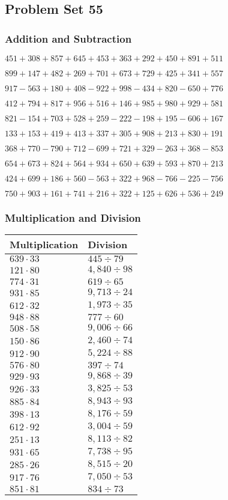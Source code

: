 \hypertarget{problem-set-55-1}{%
\subsection{Problem Set 55}\label{problem-set-55-1}}

\hypertarget{addition-and-subtraction-155}{%
\subsubsection{Addition and
Subtraction}\label{addition-and-subtraction-155}}

\(451 + 308 + 857 + 645 + 453 + 363 + 292 + 450 + 891 + 511\)

\(899 + 147 + 482 + 269 + 701 + 673 + 729 + 425 + 341 + 557\)

\(917 - 563 + 180 + 408 - 922 + 998 - 434 + 820 - 650 + 776\)

\(412 + 794 + 817 + 956 + 516 + 146 + 985 + 980 + 929 + 581\)

\(821 - 154 + 703 + 528 + 259 - 222 - 198 + 195 - 606 + 167\)

\(133 + 153 + 419 + 413 + 337 + 305 + 908 + 213 + 830 + 191\)

\(368 + 770 - 790 + 712 - 699 + 721 + 329 - 263 + 368 - 853\)

\(654 + 673 + 824 + 564 + 934 + 650 + 639 + 593 + 870 + 213\)

\(424 + 699 + 186 + 560 - 563 + 322 + 968 - 766 - 225 - 756\)

\(750 + 903 + 161 + 741 + 216 + 322 + 125 + 626 + 536 + 249\)

\hypertarget{multiplication-and-division-155}{%
\subsubsection{Multiplication and
Division}\label{multiplication-and-division-155}}

\begin{longtable}[]{@{}ll@{}}
\toprule
Multiplication & Division\tabularnewline
\midrule
\endhead
\(639 \cdot 33\) & \(445 ÷ 79\)\tabularnewline
\(121 \cdot 80\) & \(4,840÷98\)\tabularnewline
\(774 \cdot 31\) & \(619÷65\)\tabularnewline
\(931 \cdot 85\) & \(9,713÷24\)\tabularnewline
\(612 \cdot 32\) & \(1,973÷35\)\tabularnewline
\(948 \cdot 88\) & \(777÷60\)\tabularnewline
\(508 \cdot 58\) & \(9,006÷66\)\tabularnewline
\(150 \cdot 86\) & \(2,460÷74\)\tabularnewline
\(912 \cdot 90\) & \(5,224÷88\)\tabularnewline
\(576 \cdot 80\) & \(397 ÷ 74\)\tabularnewline
\(929 \cdot 93\) & \(9,868÷39\)\tabularnewline
\(926 \cdot 33\) & \(3,825÷53\)\tabularnewline
\(885 \cdot 84\) & \(8,943÷93\)\tabularnewline
\(398 \cdot 13\) & \(8,176÷59\)\tabularnewline
\(612 \cdot 92\) & \(3,004÷59\)\tabularnewline
\(251 \cdot 13\) & \(8,113÷82\)\tabularnewline
\(931 \cdot 65\) & \(7,738÷95\)\tabularnewline
\(285 \cdot 26\) & \(8,515÷20\)\tabularnewline
\(917 \cdot 76\) & \(7,050÷53\)\tabularnewline
\(851 \cdot 81\) & \(834÷73\)\tabularnewline
\bottomrule
\end{longtable}

